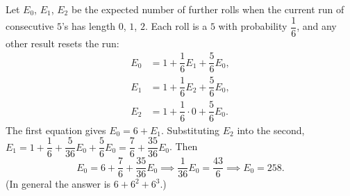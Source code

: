 Let $E_0$, $E_1$, $E_2$ be the expected number of further rolls when the current run of consecutive $5$'s has length $0$, $1$, $2$. Each roll is a $5$ with probability $\dfrac16$, and any other result resets the run:
\begin{align*}
E_0&=1+\dfrac16E_1+\dfrac56E_0,\\
E_1&=1+\dfrac16E_2+\dfrac56E_0,\\
E_2&=1+\dfrac16\cdot0+\dfrac56E_0.
\end{align*}
The first equation gives $E_0=6+E_1$. Substituting $E_2$ into the second, $E_1=1+\dfrac16+\dfrac{5}{36}E_0+\dfrac56E_0=\dfrac76+\dfrac{35}{36}E_0$. Then
\[E_0=6+\dfrac76+\dfrac{35}{36}E_0\implies\dfrac{1}{36}E_0=\dfrac{43}{6}\implies E_0=\boxed{258}.\]
(In general the answer is $6+6^2+6^3$.)
